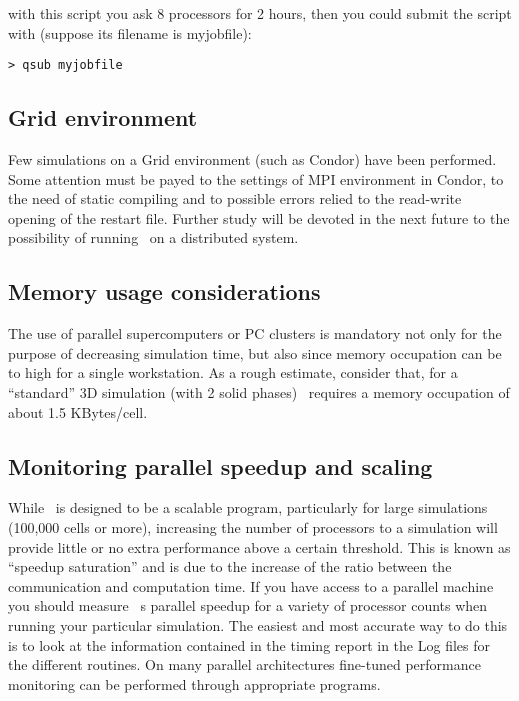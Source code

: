 with this script you ask 8 processors for 2 hours, then
you could submit the script with 
(suppose its filename is myjobfile):

\begin{verbatim}
> qsub myjobfile
\end{verbatim}

\subsection{Grid environment}

Few simulations on a Grid environment (such as Condor) have been performed.
Some attention must be payed to the settings of MPI environment in Condor,
to the need of static compiling and to possible errors relied to the
read-write opening of the restart file. Further study will be devoted in
the next future to the possibility of running \PDAC\ on a distributed
system.

\subsection{Memory usage considerations}
The use of parallel supercomputers or PC clusters is mandatory not only
for the purpose of decreasing simulation time, but also since memory
occupation can be to high for a single workstation. As a rough estimate,
consider that, for a ``standard'' 3D simulation (with 2 solid phases) 
\PDAC\ requires a memory occupation of about 1.5 KBytes/cell. 

\subsection{Monitoring parallel speedup and scaling}

While \PDAC\ is designed to be a scalable program, particularly for
large simulations (100,000 cells or more), increasing the number of
processors to a simulation will provide little or no extra performance
above a certain threshold. This is known as ``speedup saturation'' and is
due to the increase of the ratio between the communication and computation
time. If you have access to a parallel machine you should
measure \PDAC\ s parallel speedup for a variety of processor counts when
running your particular simulation. The easiest and most accurate way
to do this is to look at the information contained in the timing report
in the Log files for the different routines. On many parallel architectures
fine-tuned performance monitoring can be performed through appropriate programs.
